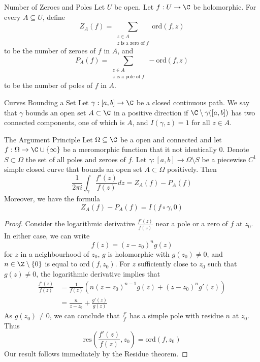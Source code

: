 \documentclass[a4paper]{article}
\begin{document}
\begin{defn}{Number of Zeroes and Poles}{} Let $U$ be open. Let $f:U\to\C$ be holomorphic. For every $A\subseteq U$, define $$Z_A(f)=\sum_{\substack{z\in A\\ z\text{ is a zero of }f}}\text{ord}(f,z)$$ to be the number of zeroes of $f$ in $A$, and $$P_A(f)=\sum_{\substack{z\in A\\ z\text{ is a pole of }f}}-\text{ord}(f,z)$$ to be the number of poles of $f$ in $A$. 
\end{defn}

\begin{defn}{Curves Bounding a Set}{} Let $\gamma:[a,b]\to\C$ be a closed continuous path. We say that $\gamma$ bounds an open set $A\subset\C$ in a positive direction if $\C\setminus\gamma([a,b])$ has two connected components, one of which is $A$, and $I(\gamma,z)=1$ for all $z\in A$. 
\end{defn}

\begin{thm}{The Argument Principle}{} Let $\Omega\subseteq\C$ be a open and connected and let $f:\Omega\to\C\cup\{\infty\}$ be a meromorphic function that it not identically $0$. Denote $S\subset\Omega$ the set of all poles and zeroes of $f$. Let $\gamma:[a,b]\to\Omega\setminus S$ be a piecewise $C^1$ simple closed curve that bounds an open set $A\subset\Omega$ positively. Then $$\frac{1}{2\pi i}\int_\gamma\frac{f'(z)}{f(z)}dz=Z_A(f)-P_A(f)$$ Moreover, we have the formula $$Z_A(f)-P_A(f)=I(f\circ\gamma,0)$$ \tcbline
\begin{proof}
Consider the logarithmic derivative $\frac{f'(z)}{f(z)}$ near a pole or a zero of $f$ at $z_0$. In either case, we can write $$f(z)=(z-z_0)^ng(z)$$ for $z$ in a neighbourhood of $z_0$, $g$ is holomorphic with $g(z_0)\neq 0$, and $n\in\Z\setminus\{0\}$ is equal to $\text{ord}(f,z_0)$. For $z$ sufficiently close to $z_0$ such that $g(z)\neq 0$, the logarithmic derivative implies that 
\begin{align*}
\frac{f'(z)}{f(z)}&=\frac{1}{f(z)}\left(n(z-z_0)^{n-1}g(z)+(z-z_0)^ng'(z)\right)\\
&=\frac{n}{z-z_0}+\frac{g'(z)}{g(z)}
\end{align*}
As $g(z_0)\neq 0$, we can conclude that $\frac{f'}{f}$ has a simple pole with residue $n$ at $z_0$. Thus $$\text{res}\left(\frac{f'(z)}{f(z)},z_0\right)=\text{ord}(f,z_0)$$ Our result follows immediately by the Residue theorem. 
\end{proof}
\end{thm}
\end{document}
